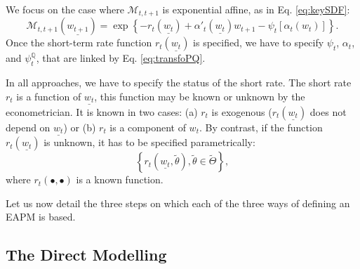 \documentclass[
  12pt,
]{book}
\theoremstyle{definition}
\theoremstyle{definition}
\theoremstyle{definition}
\theoremstyle{definition}
\theoremstyle{remark}
\begin{document}
We focus on the case where \(\mathcal{M}_{t,t+1}\) is exponential affine, as in Eq. \eqref{eq:keySDF}:
\[
\mathcal{M}_{t,t+1} (\underline{w_{t+1}}) = \exp\left\{ -r_{t} (\underline{w_t}) + \alpha'_t(\underline{w_t})w_{t+1} - \psi_t [\alpha_t (w_t)]\right\}.
\]
Once the short-term rate function \(r_{t}(\underline{w_t})\) is specified, we have to specify \(\psi_t\), \(\alpha_t\), and \(\psi^{\mathbb{Q}}_t\), that are linked by Eq. \eqref{eq:transfoPQ}.

In all approaches, we have to specify the status of the short rate. The short rate \(r_{t}\) is a function of \(\underline{w_t}\), this function may be known or unknown by the econometrician. It is known in two cases: (a) \(r_{t}\) is exogenous (\(r_{t}(\underline{w_t})\) does not depend on \(\underline{w_t}\)) or (b) \(r_{t}\) is a component of \(w_t\). By contrast, if the function \(r_{t} (\underline{w_t})\) is unknown, it has to be specified parametrically:
\[
\left\{ r_{t} (\underline{w_t}, \tilde{\theta}), \tilde{\theta}\in \tilde{\Theta} \right\},
\]
where \(r_{t}(\bullet,\bullet)\) is a known function.

Let us now detail the three steps on which each of the three ways of defining an EAPM is based.

\hypertarget{the-direct-modelling}{%
\subsection{The Direct Modelling}\label{the-direct-modelling}}
\end{document}
